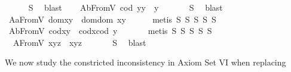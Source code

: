 \begin{isabellebody}
%
\isadelimproof
\ \ \ \ %
\endisadelimproof
%
\isatagproof
{}\isamarkupfalse%
\ S{}\ \isamarkupfalse%
\ blast%
\endisatagproof
{\isafoldproof}%
%
\isadelimproof
\isanewline
%
\endisadelimproof
\ \ \isamarkupfalse%
\ A{}bFromV{\isacharcolon}\ {\isachardoublequoteopen}{\isacharparenleft}cod\ y{\isacharparenright}{\isasymcdot}y\ {\isasymcong}\ y{\isachardoublequoteclose}\ \isanewline
%
\isadelimproof
\ \ \ \ %
\endisadelimproof
%
\isatagproof
{}\isamarkupfalse%
\ S{}\ \isamarkupfalse%
\ blast%
\endisatagproof
{\isafoldproof}%
%
\isadelimproof
\isanewline
%
\endisadelimproof
\ \ \isamarkupfalse%
\ A{}aFromV{\isacharcolon}\ {\isachardoublequoteopen}dom{\isacharparenleft}x{\isasymcdot}y{\isacharparenright}\ {\isasymcong}\ dom{\isacharparenleft}{\isacharparenleft}dom\ x{\isacharparenright}{\isasymcdot}y{\isacharparenright}{\isachardoublequoteclose}\isanewline
%
\isadelimproof
\ \ \ \ %
\endisadelimproof
%
\isatagproof
{}\isamarkupfalse%
\ {\isacharparenleft}metis\ S{}\ S{}\ S{}\ S{}\ S{}{\isacharparenright}%
\endisatagproof
{\isafoldproof}%
%
\isadelimproof
\isanewline
%
\endisadelimproof
\ \ \isamarkupfalse%
\ A{}bFromV{\isacharcolon}\ {\isachardoublequoteopen}cod{\isacharparenleft}x{\isasymcdot}y{\isacharparenright}\ {\isasymcong}\ cod{\isacharparenleft}x{\isasymcdot}{\isacharparenleft}cod\ y{\isacharparenright}{\isacharparenright}{\isachardoublequoteclose}\ \isanewline
%
\isadelimproof
\ \ \ \ %
\endisadelimproof
%
\isatagproof
{}\isamarkupfalse%
\ {\isacharparenleft}metis\ S{}\ S{}\ S{}\ S{}\ S{}{\isacharparenright}%
\endisatagproof
{\isafoldproof}%
%
\isadelimproof
\isanewline
%
\endisadelimproof
\ \ \isamarkupfalse%
\ \ A{}FromV{\isacharcolon}\ {\isachardoublequoteopen}x{\isasymcdot}{\isacharparenleft}y{\isasymcdot}z{\isacharparenright}\ {\isasymcong}\ {\isacharparenleft}x{\isasymcdot}y{\isacharparenright}{\isasymcdot}z{\isachardoublequoteclose}\ \isanewline
%
\isadelimproof
\ \ \ \ %
\endisadelimproof
%
\isatagproof
{}\isamarkupfalse%
\ S{}\ \isamarkupfalse%
\ blast%
\endisatagproof
{\isafoldproof}%
%
\isadelimproof
%
\endisadelimproof
%
\isamarkuptrue%
%
\begin{isamarkuptext}%
We now study the constricted inconsistency in Axiom Set VI when replacing  \isa{{\isasymsimeq}}  

\end{isamarkuptext}
\end{isabellebody}
